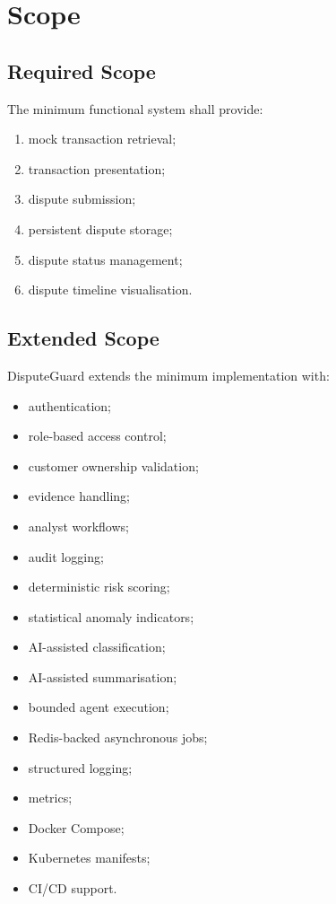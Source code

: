 \documentclass[11pt,a4paper]{article}
\begin{document}
\section{Scope}

\subsection{Required Scope}

The minimum functional system shall provide:

\begin{enumerate}
    \item mock transaction retrieval;
    \item transaction presentation;
    \item dispute submission;
    \item persistent dispute storage;
    \item dispute status management;
    \item dispute timeline visualisation.
\end{enumerate}

\subsection{Extended Scope}

DisputeGuard extends the minimum implementation with:

\begin{itemize}
    \item authentication;
    \item role-based access control;
    \item customer ownership validation;
    \item evidence handling;
    \item analyst workflows;
    \item audit logging;
    \item deterministic risk scoring;
    \item statistical anomaly indicators;
    \item AI-assisted classification;
    \item AI-assisted summarisation;
    \item bounded agent execution;
    \item Redis-backed asynchronous jobs;
    \item structured logging;
    \item metrics;
    \item Docker Compose;
    \item Kubernetes manifests;
    \item CI/CD support.
\end{itemize}
\end{document}
